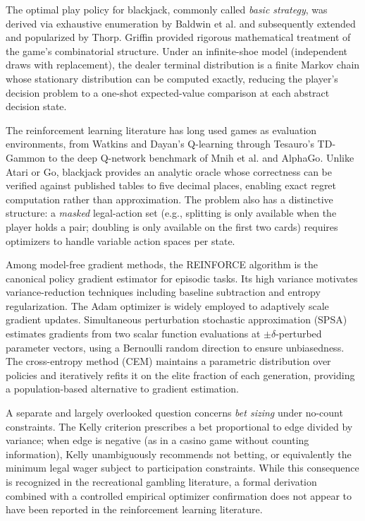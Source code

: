 \documentclass[12pt]{article}
\begin{document}
The optimal play policy for blackjack, commonly called \emph{basic strategy}, was
derived via exhaustive enumeration by Baldwin et al.\cite{Baldwin1956} and subsequently
extended and popularized by Thorp\cite{Thorp1966}.  Griffin\cite{Griffin1999} provided
rigorous mathematical treatment of the game's combinatorial structure.  Under an
infinite-shoe model (independent draws with replacement), the dealer terminal
distribution is a finite Markov chain whose stationary distribution can be computed
exactly\cite{Bellman1957}, reducing the player's decision problem to a one-shot
expected-value comparison at each abstract decision state.

The reinforcement learning literature has long used games as evaluation environments,
from Watkins and Dayan's Q-learning\cite{Watkins1992} through Tesauro's
TD-Gammon\cite{Tesauro1995} to the deep Q-network benchmark of Mnih et al.\cite{Mnih2015}
and AlphaGo\cite{Silver2016}.  Unlike Atari or Go, blackjack provides an analytic
oracle whose correctness can be verified against published tables to five decimal
places, enabling exact regret computation rather than approximation.  The problem also
has a distinctive structure: a \emph{masked} legal-action set (e.g., splitting is only
available when the player holds a pair; doubling is only available on the first two
cards) requires optimizers to handle variable action spaces per state.

Among model-free gradient methods, the REINFORCE algorithm\cite{Williams1992} is the
canonical policy gradient estimator for episodic tasks.  Its high variance motivates
variance-reduction techniques including baseline subtraction\cite{Sutton1988} and
entropy regularization.  The Adam optimizer\cite{Kingma2015} is widely employed to
adaptively scale gradient updates.  Simultaneous perturbation stochastic approximation
(SPSA)\cite{Spall1992,Spall1998} estimates gradients from two scalar function
evaluations at $\pm\delta$-perturbed parameter vectors, using a Bernoulli random
direction to ensure unbiasedness.  The cross-entropy method (CEM)\cite{Rubinstein1999,
DeBoer2005} maintains a parametric distribution over policies and iteratively refits
it on the elite fraction of each generation, providing a population-based alternative
to gradient estimation.

A separate and largely overlooked question concerns \emph{bet sizing} under no-count
constraints.  The Kelly criterion\cite{Kelly1956} prescribes a bet proportional to
edge divided by variance; when edge is negative (as in a casino game without counting
information), Kelly unambiguously recommends not betting, or equivalently the minimum
legal wager subject to participation constraints.  While this consequence is recognized
in the recreational gambling literature, a formal derivation combined with a
controlled empirical optimizer confirmation does not appear to have been reported in
the reinforcement learning literature.
\end{document}
